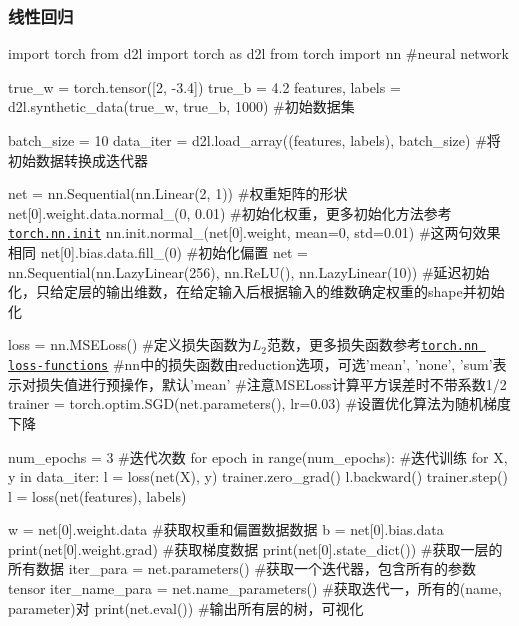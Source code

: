     \subsubsection{线性回归}
      \begin{codeblock}[language=python, caption=]
        import torch
        from d2l import torch as d2l
        from torch import nn #neural network

        true_w = torch.tensor([2, -3.4])
        true_b = 4.2
        features, labels = d2l.synthetic_data(true_w, true_b, 1000) #初始数据集

        batch_size = 10
        data_iter = d2l.load_array((features, labels), batch_size) #将初始数据转换成迭代器

        net = nn.Sequential(nn.Linear(2, 1)) #权重矩阵的形状
        net[0].weight.data.normal_(0, 0.01) #初始化权重，更多初始化方法参考\href{https://pytorch.org/docs/stable/nn.init.html}{\underline{\texttt{torch.nn.init}}}
        nn.init.normal_(net[0].weight, mean=0, std=0.01) #这两句效果相同
        net[0].bias.data.fill_(0) #初始化偏置
        net = nn.Sequential(nn.LazyLinear(256), nn.ReLU(), nn.LazyLinear(10)) 
            #延迟初始化，只给定层的输出维数，在给定输入后根据输入的维数确定权重的shape并初始化

        loss = nn.MSELoss() #定义损失函数为$L_2$范数，更多损失函数参考\href{https://pytorch.org/docs/stable/nn.html#loss-functions}{\underline{\texttt{torch.nn loss-functions}}}
            #nn中的损失函数由reduction选项，可选'mean', 'none', 'sum'表示对损失值进行预操作，默认'mean'
            #注意MSELoss计算平方误差时不带系数1/2
        trainer = torch.optim.SGD(net.parameters(), lr=0.03) #设置优化算法为随机梯度下降

        num_epochs = 3 #迭代次数
        for epoch in range(num_epochs): #迭代训练
            for X, y in data_iter:
                l = loss(net(X), y)
                trainer.zero_grad()
                l.backward()
                trainer.step()
            l = loss(net(features), labels)

        w = net[0].weight.data #获取权重和偏置数据数据
        b = net[0].bias.data
        print(net[0].weight.grad) #获取梯度数据
        print(net[0].state_dict()) #获取一层的所有数据
        iter_para = net.parameters() #获取一个迭代器，包含所有的参数tensor
        iter_name_para = net.name_parameters() #获取迭代一，所有的(name, parameter)对
        print(net.eval()) #输出所有层的树，可视化
      \end{codeblock}

